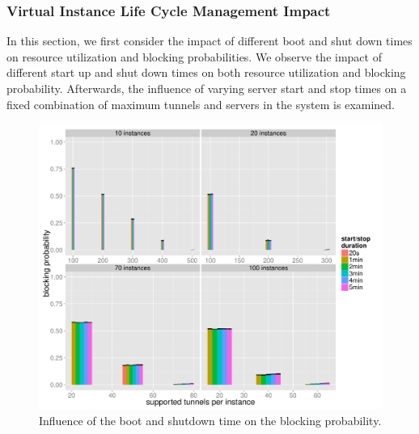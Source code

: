 \subsubsection{Virtual Instance Life Cycle Management Impact}

In this section, we first consider the impact of different boot and shut down times on resource utilization and blocking probabilities. We observe the impact of different start up and shut down times on both resource utilization and blocking probability. Afterwards, the influence of varying server start and stop times on a fixed combination of maximum tunnels and servers in the system is examined.



\begin{figure}[htb]
  \centering
  \includegraphics[width=1.0\textwidth]{images/R-virtualized-startstop-blocking-barchart.pdf}
  \caption{Influence of the boot and shutdown time on the blocking probability.}
\label{c4:fig:blockprob-startstop-barchart}
\end{figure}


